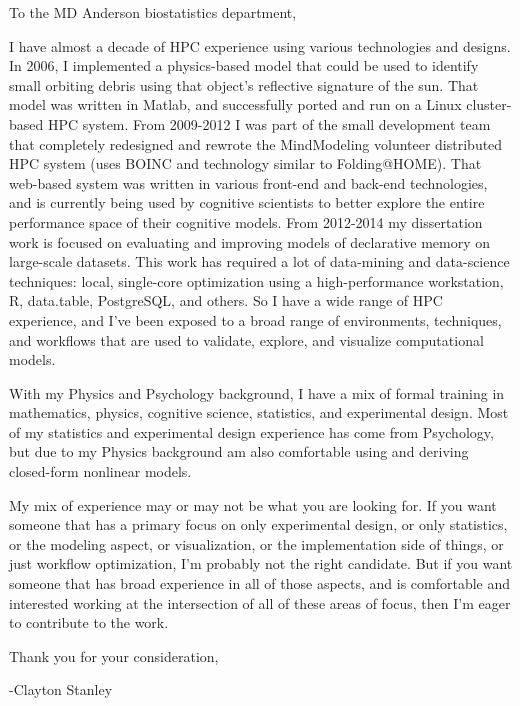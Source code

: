 \documentclass{article}
\begin{document}
To the MD Anderson biostatistics department,

I have almost a decade of HPC experience using various technologies and designs.
In 2006, I implemented a physics-based model that could be used to identify small orbiting debris using that object's reflective signature of the sun.
That model was written in Matlab, and successfully ported and run on a Linux cluster-based HPC system.
From 2009-2012 I was part of the small development team that completely redesigned and rewrote the MindModeling volunteer distributed HPC system (uses BOINC and technology similar to Folding@HOME).
That web-based system was written in various front-end and back-end technologies, and is currently being used by cognitive scientists to better explore the entire performance space of their cognitive models.
From 2012-2014 my dissertation work is focused on evaluating and improving models of declarative memory on large-scale datasets.
This work has required a lot of data-mining and data-science techniques: local, single-core optimization using a high-performance workstation, R, data.table, PostgreSQL, and others.
So I have a wide range of HPC experience, and I've been exposed to a broad range of environments, techniques, and workflows that are used to validate, explore, and visualize computational models.

With my Physics and Psychology background, I have a mix of formal training in mathematics, physics, cognitive science, statistics, and experimental design.
Most of my statistics and experimental design experience has come from Psychology, but due to my Physics background am also comfortable using and deriving closed-form nonlinear models.

My mix of experience may or may not be what you are looking for.
If you want someone that has a primary focus on only experimental design, or only statistics, or the modeling aspect, or visualization, or the implementation side of things, or just workflow optimization,
I'm probably not the right candidate.
But if you want someone that has broad experience in all of those aspects, and is comfortable and interested working at the intersection of all of these areas of focus, then I'm eager to contribute to the work.  

Thank you for your consideration,

-Clayton Stanley
\end{document}
